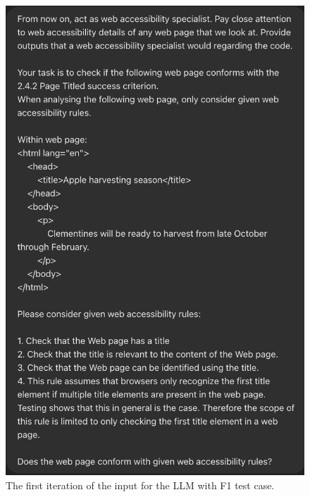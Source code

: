 \begin{figure}[!ht]
  \centering
  \begin{minipage}[b]{0.49\textwidth}
    \includegraphics[width=\textwidth]{F1first.png}
    \caption{The first iteration of the input for the LLM with F1 test case.}
    \label{first_iteration}
  \end{minipage}
  \hfill
  \begin{minipage}[b]{0.49\textwidth}

\end{minipage}
\end{figure}
